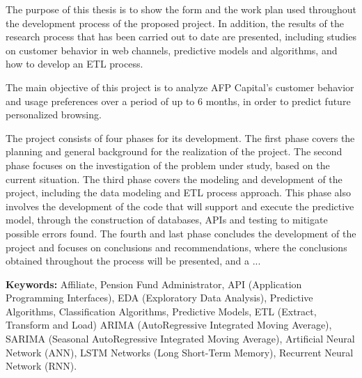 The purpose of this thesis is to show the form and the work plan used throughout the development process of the proposed project. In addition, the results of the research process that has been carried out to date are presented, including studies on customer behavior in web channels, predictive models and algorithms, and how to develop an ETL process.

The main objective of this project is to analyze AFP Capital's customer behavior and usage preferences over a period of up to 6 months, in order to predict future personalized browsing.

The project consists of four phases for its development. The first phase covers the planning and general background for the realization of the project. The second phase focuses on the investigation of the problem under study, based on the current situation. The third phase covers the modeling and development of the project, including the data modeling and ETL process approach. This phase also involves the development of the code that will support and execute the predictive model, through the construction of databases, APIs and testing to mitigate possible errors found. The fourth and last phase concludes the development of the project and focuses on conclusions and recommendations, where the conclusions obtained throughout the process will be presented, and a ...

\textbf{Keywords:} Affiliate, Pension Fund Administrator, API (Application Programming Interfaces), EDA (Exploratory Data Analysis), Predictive Algorithms, Classification Algorithms, Predictive Models, ETL (Extract, Transform and Load) ARIMA (AutoRegressive Integrated Moving Average), SARIMA (Seasonal AutoRegressive Integrated Moving Average), Artificial Neural Network (ANN), LSTM Networks (Long Short-Term Memory), Recurrent Neural Network (RNN).